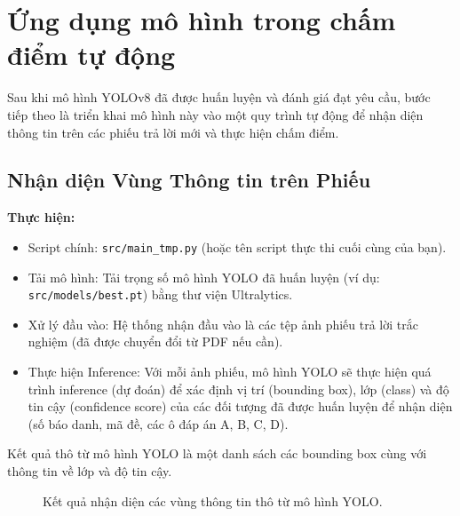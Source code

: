 \chapter{Ứng dụng mô hình trong chấm điểm tự động }
\label{sec:inference_grading}
Sau khi mô hình YOLOv8 đã được huấn luyện và đánh giá đạt yêu cầu, bước tiếp theo là triển khai mô hình này vào một quy trình tự động để nhận diện thông tin trên các phiếu trả lời mới và thực hiện chấm điểm.

\section{Nhận diện Vùng Thông tin trên Phiếu}
\label{sec:info_detection}
\textbf{Thực hiện:}
\begin{itemize}
    \item Script chính: \texttt{src/main\_tmp.py} (hoặc tên script thực thi cuối cùng của bạn).
    \item Tải mô hình: Tải trọng số mô hình YOLO đã huấn luyện (ví dụ: \texttt{src/models/best.pt}) bằng thư viện Ultralytics.
    \item Xử lý đầu vào: Hệ thống nhận đầu vào là các tệp ảnh phiếu trả lời trắc nghiệm (đã được chuyển đổi từ PDF nếu cần).
    \item Thực hiện Inference: Với mỗi ảnh phiếu, mô hình YOLO sẽ thực hiện quá trình inference (dự đoán) để xác định vị trí (bounding box), lớp (class) và độ tin cậy (confidence score) của các đối tượng đã được huấn luyện để nhận diện (số báo danh, mã đề, các ô đáp án A, B, C, D).
\end{itemize}
Kết quả thô từ mô hình YOLO là một danh sách các bounding box cùng với thông tin về lớp và độ tin cậy.

\begin{figure}[H]
    \centering
    \caption{Kết quả nhận diện các vùng thông tin thô từ mô hình YOLO.}
    \label{fig:inference_raw}
\end{figure}

